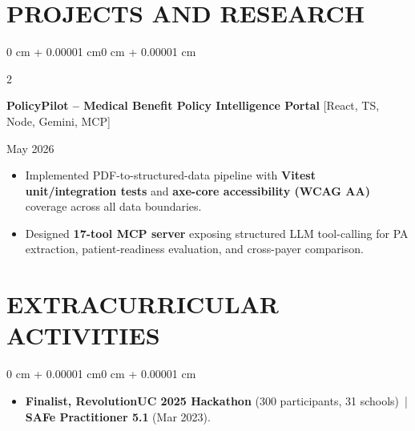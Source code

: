 \documentclass[10pt, letterpaper]{article}
\newenvironment{highlights}{
    \begin{itemize}[
        topsep=0.10 cm,
        parsep=0.06 cm,
        partopsep=0pt,
        itemsep=0.06 cm,
        leftmargin=12pt
    ]
}{
    \end{itemize}
}
\newenvironment{onecolentry}{
    \begin{adjustwidth}{0 cm + 0.00001 cm}{0 cm + 0.00001 cm}
}{
    \end{adjustwidth}
}
\newenvironment{twocolentry}[2][]{
    \onecolentry
    \def\secondColumn{#2}
    \setcolumnwidth{\fill, 4.5 cm}
    \begin{paracol}{2}
}{
    \switchcolumn \raggedleft \secondColumn
    \end{paracol}
    \endonecolentry
}
\begin{document}
\section{PROJECTS AND RESEARCH}
\begin{twocolentry}{May 2026}
\textbf{PolicyPilot -- Medical Benefit Policy Intelligence Portal} [React, TS, Node, Gemini, MCP]
\end{twocolentry}
\begin{highlights}
  \item Implemented PDF-to-structured-data pipeline with \textbf{Vitest unit/integration tests} and \textbf{axe-core accessibility (WCAG AA)} coverage across all data boundaries.
  \item Designed \textbf{17-tool MCP server} exposing structured LLM tool-calling for PA extraction, patient-readiness evaluation, and cross-payer comparison.
\end{highlights}

\section{EXTRACURRICULAR ACTIVITIES}
\begin{onecolentry}
\begin{highlights}
  \item \textbf{Finalist, RevolutionUC 2025 Hackathon} (300 participants, 31 schools) \,|\, \textbf{SAFe Practitioner 5.1} (Mar 2023).
\end{highlights}
\end{onecolentry}
\end{document}

